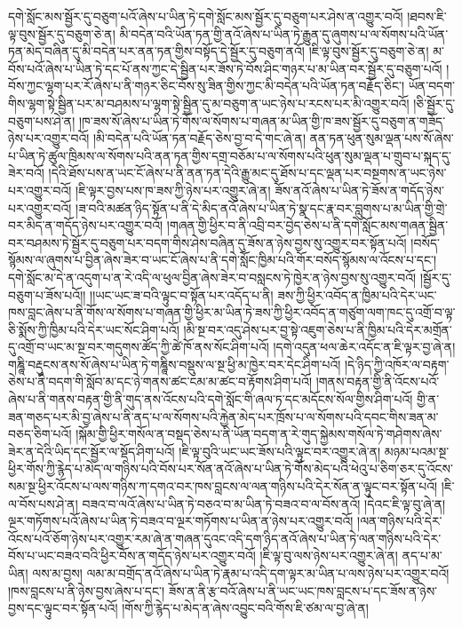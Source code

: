 དགེ་སློང་མས་སྦྱོར་དུ་བཅུག་པའོ་ཞེས་པ་ཡིན་ཏེ་དགེ་སློང་མས་སྦྱོར་དུ་བཅུག་པར་ཤེས་ན་འགྱུར་བའོ། །ཐབས་ཇི་ལྟ་བུས་སྦྱོར་དུ་བཅུག་ཅེ་ན། མི་བདེན་བའི་ཡོན་ཏན་གྱི་ནའོ་ཞེས་པ་ཡིན་ཏེ་རྒྱུན་དུ་ཞུགས་པ་ལ་སོགས་པའི་ཡོན་ཏན་མེད་བཞིན་དུ་མི་བདེན་པར་ནན་ཏན་གྱིས་བསྟོད་དེ་སྦྱོར་དུ་བཅུག་ནའོ། །ཇི་ལྟ་བུས་སྦྱོར་དུ་བཅུག་ཅེ་ན། མ་བོས་པའོ་ཞེས་པ་ཡིན་ཏེ་དང་པོ་ནས་ཀྱང་དེ་སྦྱིན་པར་ཟོས་ཏེ་བོས་ཤིང་གཉར་པ་མ་ཡིན་བར་སྦྱོར་དུ་བཅུག་པའོ། །བོས་ཀྱང་ལྷག་པར་རོ་ཞེས་པ་ནི་གཉར་ཅིང་བོས་སུ་ཟིན་གྱིས་ཀྱང་མི་བདེན་པའི་ཡོན་ཏན་བརྗོད་ཅིང་། ཡོན་བདག་གིས་ལྷག་སྟེ་སྦྱིན་པར་མ་བཤམས་པ་ལྷག་སྟེ་སྦྱིན་དུ་མ་བཅུག་ན་ཡང་ཉེས་པ་རངས་པར་མི་འགྱུར་བའོ། །ཅི་སྦྱོར་དུ་བཅུག་པས་ཤེ་ན། །ཁ་ཟས་སོ་ཞེས་པ་ཡིན་ཏེ་གོས་ལ་སོགས་པ་གཞན་མ་ཡིན་གྱི་ཁ་ཟས་སྦྱོར་དུ་བཅུག་ན་གཟོད་ཉེས་པར་འགྱུར་བའོ། །མི་བདེན་པའི་ཡོན་ཏན་བརྗོད་ཅེས་བྱ་བ་དེ་གང་ཞེ་ན། ནན་ཏན་ཕུན་སུམ་ལྡན་པས་སོ་ཞེས་པ་ཡིན་ཏེ་ཚུལ་ཁྲིམས་ལ་སོགས་པའི་ནན་ཏན་གྱིས་དགྲ་བཅོམ་པ་ལ་སོགས་པའི་ཕུན་སུམ་ལྡན་པ་གྲུབ་པ་སྐད་དུ་ཟེར་བའོ། །དེའི་ཐོས་པས་ན་ཡང་ངོ་ཞེས་པ་ནི་ནན་ཏན་དེའི་རྒྱུ་མང་དུ་ཐོས་པ་དང་ལྡན་པར་བསྔགས་ན་ཡང་ཉེས་པར་འགྱུར་བའོ། །ཇི་ལྟར་བྱས་པས་ཁ་ཟས་ཀྱི་ཉེས་པར་འགྱུར་ཞེ་ན། ཟོས་ནའོ་ཞེས་པ་ཡིན་ཏེ་ཟོས་ན་གདོད་ཉེས་པར་འགྱུར་བའོ། །ཟ་བའི་མཚན་ཉིད་སྟོན་པ་ནི་དེ་མིད་ནའོ་ཞེས་པ་ཡིན་ཏེ་སྣ་དང་རྣ་བར་བླུགས་པ་མ་ཡིན་གྱི་གྲེ་བར་མིད་ན་གདོད་ཉེས་པར་འགྱུར་བའོ། །གཞན་གྱི་ཕྱིར་བ་ནི་འབྲི་བར་བྱེད་ཅེས་པ་ནི་དགེ་སློང་མས་གཞན་སྦྱིན་བར་བཤམས་ཏེ་སྦྱོར་དུ་བཅུག་པར་བདག་གིས་ཤེས་བཞིན་དུ་ཟོས་ན་ཉེས་བྱས་སུ་འགྱུར་བར་སྟོན་པའོ། །བསོད་སྙོམས་ལ་ཞུགས་པ་བྱིན་ཞེས་ཟེར་བ་ཡང་ངོ་ཞེས་པ་ནི་དགེ་སློང་ཁྱིམ་པའི་གོར་བསོད་སྙོམས་ལ་འོངས་པ་དང་། དགེ་སློང་མ་དེ་ན་འདུག་པ་ན་རེ་འདི་ལ་ཕུལ་བྱིན་ཞེས་ཟེར་བ་བསླངས་ཏེ་ཁྱེར་ན་ཉེས་བྱས་སུ་འགྱུར་བའོ། །སྦྱོར་དུ་བཅུག་པ་ཟོས་པའོ།། །།ཡང་ཡང་ཟ་བའི་ལྟུང་བ་སྟོན་པར་འདོད་པ་ནི། ཟས་ཀྱི་ཕྱིར་འབོད་ན་ཁྱིམ་པའི་དེར་ཡང་ཁས་བླང་ཞེས་པ་ནི་གོས་ལ་སོགས་པ་གཞན་གྱི་ཕྱིར་མ་ཡིན་ཏེ་ཟས་ཀྱི་ཕྱིར་འབོད་ན་གཙུག་ལག་ཁང་དུ་འགྲོ་བ་ལྟ་ཅི་སྨོས་ཀྱི་ཁྱིམ་པའི་དེར་ཡང་སོང་ཤིག་པའོ། །མི་སྔ་བར་འདུ་ཤེས་པར་བྱ་སྟེ་འཇུག་ཅེས་པ་ནི་ཁྱིམ་པའི་དེར་མགྲོན་དུ་འགྲོ་བ་ཡང་མ་སྔ་བར་གདུགས་ཚོད་ཀྱི་ཚེ་ཁོ་ནས་སོང་ཤིག་པའོ། །དགེ་འདུན་ཕལ་ཆེར་འདོང་ན་ཇི་ལྟར་བྱ་ཞེ་ན། གཎྜཱི་བརྡུངས་ནས་སོ་ཞེས་པ་ཡིན་ཏེ་གཎྜཱིས་བསྡུས་ལ་སྔ་ཕྱི་མ་ཁྱེར་བར་དེང་ཤིག་པའོ། །དེ་ཉིད་ཀྱི་འཁོར་ལ་བརྟག་ཅེས་པ་ནི་བདག་གི་སློབ་མ་དང་ཉེ་གནས་ཚང་ངམ་མ་ཚང་བ་རྟོགས་ཤིག་པའོ། །གནས་བརྟན་གྱི་ནི་འོངས་པའོ་ཞེས་པ་ནི་གནས་བརྟན་གྱི་ནི་གུད་ནས་འོངས་པའི་དགེ་སློང་གི་ཞལ་ཏ་དང་མདོངས་སོལ་གྱིས་ཤིག་པའོ། གྱི་ན་ཟན་གཅད་པར་མི་བྱ་ཞེས་པ་ནི་ནད་པ་ལ་སོགས་པའི་རྐྱེན་མེད་པར་ཁྲོས་པ་ལ་སོགས་པའི་དབང་གིས་ཟན་མ་བཅད་ཅིག་པའོ། །སྐོམ་གྱི་ཕྱིར་གསོལ་ན་བསྡད་ཅེས་པ་ནི་ཡོན་བདག་ན་རེ་གུད་སྐྱེམས་གསོལ་ཏེ་གཤེགས་ཞེས་ཟེར་ན་དེའི་ཡིད་དང་སྦྱོར་ལ་སྡོད་ཤིག་པའོ། །ཇི་ལྟ་བུའི་ཡང་ཡང་ཟོས་པའི་ལྟུང་བར་འགྱུར་ཞེ་ན། མཉམ་པའམ་སྔ་ཕྱིར་གོས་ཀྱི་རྙེད་པ་མེད་ལ་གཉིས་པའི་བོས་པར་སོན་ནའོ་ཞེས་པ་ཡིན་ཏེ་གོས་མེད་པའི་ཕེའུ་པ་ཅིག་ཅར་དུ་འོངས་སམ་སྔ་ཕྱིར་འོངས་པ་ལས་གཉིས་ཀ་དགའ་བར་ཁས་བླངས་ལ་ལན་གཉིས་པའི་དེར་སོན་ན་ལྟུང་བར་སྟོན་པའོ། །ཇི་ལ་བོས་པས་ཤེ་ན། བཟའ་བ་ལའོ་ཞེས་པ་ཡིན་ཏེ་བཅའ་བ་མ་ཡིན་ཏེ་བཟའ་བ་ལ་བོས་ནའོ། །དེའང་ཇི་ལྟ་བུ་ཞེ་ན། ལྔར་གཏོགས་པའོ་ཞེས་པ་ཡིན་ཏེ་བཟའ་བ་ལྔར་གཏོགས་པ་ཡིན་ན་ཉེས་པར་འགྱུར་བའོ། །ལན་གཉིས་པའི་དེར་འོངས་པའོ་ཅོག་ཉེས་པར་འགྱུར་རམ་ཞེ་ན་གཞན་དུའང་འདི་དག་ཉིད་ནའོ་ཞེས་པ་ཡིན་ཏེ་ལན་གཉིས་པའི་དེར་བོས་པ་ཡང་བཟའ་བའི་ཕྱིར་བོས་ན་གདོད་ཉེས་པར་འགྱུར་བའོ། །ཇི་ལྟ་བུ་ལས་ཉེས་པར་འགྱུར་ཞེ་ན། ནད་པ་མ་ཡིན། ལས་མ་བྱས། ལམ་མ་བགྲོད་ནའོ་ཞེས་པ་ཡིན་ཏེ་རྣམ་པ་འདི་དག་ལྟར་མ་ཡིན་པ་ལས་ཉེས་པར་འགྱུར་བའོ། །ཁས་བླངས་པ་ནི་ཉེས་བྱས་ཞེས་པ་དང་། ཟོས་ན་ནི་རྩ་བའོ་ཞེས་པ་ནི་ཡང་ཡང་ཁས་བླངས་པ་དང་ཟོས་ན་ཉེས་བྱས་དང་ལྟུང་བར་སྟོན་པའོ། །གོས་ཀྱི་རྙེད་པ་མེད་ན་ཞེས་འབྱུང་བའི་གོས་ཇི་ཙམ་ལ་བྱ་ཞེ་ན། 
